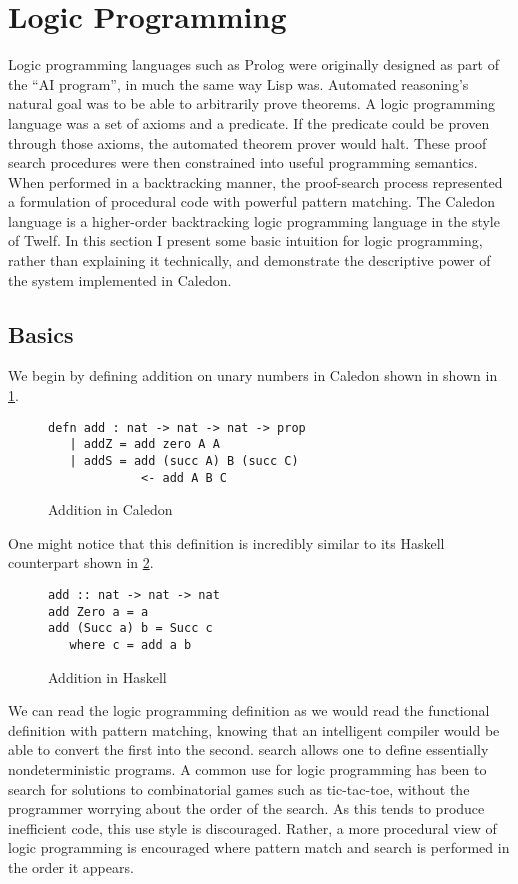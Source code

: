 \section{Logic Programming}

Logic programming languages such as Prolog were originally designed as part of the ``AI
program'', in much the same way Lisp was. Automated reasoning’s natural goal was
to be able to arbitrarily prove theorems. A logic programming language was a 
set of axioms and a predicate. If the predicate could be proven through those axioms,
the automated theorem prover would halt.  These proof search procedures were
then constrained into useful programming semantics. When performed in a backtracking
manner, the proof-search process represented a formulation of procedural code
with powerful pattern matching. The Caledon language is a higher-order backtracking
logic programming language in the style of Twelf. In this section I present some basic
intuition for logic programming, rather than explaining it technically, and demonstrate the 
descriptive power of the system implemented in Caledon.

\FloatBarrier
\subsection{Basics}
We begin by defining addition on unary numbers in Caledon shown in shown in \ref{code:add}.

\begin{figure}[H]
\begin{lstlisting}
defn add : nat -> nat -> nat -> prop
   | addZ = add zero A A
   | addS = add (succ A) B (succ C) 
             <- add A B C
\end{lstlisting}
\caption{Addition in Caledon}
\label{code:add}
\end{figure}

One might notice that this definition is incredibly similar to its Haskell counterpart shown in \ref{code:hask}.

\begin{figure}[H]
\begin{lstlisting}
add :: nat -> nat -> nat
add Zero a = a
add (Succ a) b = Succ c
   where c = add a b
\end{lstlisting}
\caption{Addition in Haskell}
\label{code:hask}
\end{figure}

We can read the logic programming definition as we would read the functional definition with pattern
matching, knowing that an intelligent compiler would be able to convert the first into the second.  
search allows one to define essentially nondeterministic programs. A common use for
logic programming has been to search for solutions to combinatorial games such as tic-tac-toe, 
without the programmer worrying about the order of the search. As this tends
to produce inefficient code, this use style is discouraged. Rather, a more procedural view of logic programming is encouraged where pattern match and search is performed
in the order it appears.

